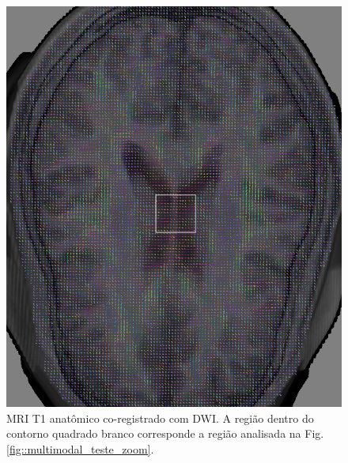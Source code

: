 \documentclass[
    12pt,                %
    oneside,            %
    a4paper,            %
    english,            %
    french,                %
    spanish,            %
    brazil                %
    ]{abntex2}
\begin{document}
\begin{figure}[ht]
    \centering
    \includegraphics[width=.56\linewidth, angle=0]{figs/Esquema_Glifo/Teste_transicao/base_teste_zoom.png}
    \caption{MRI T1 anatômico co-registrado com DWI. A região dentro do contorno quadrado branco corresponde a região analisada na Fig. \ref{fig::multimodal_teste_zoom}.}
    \label{fig::multimodal_teste_loc}
\end{figure}
\end{document}
